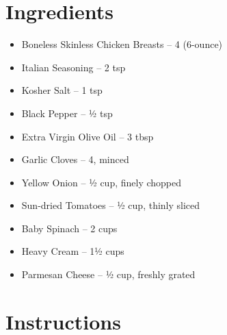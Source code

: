 




\section*{Ingredients}

\begin{itemize}
      \item Boneless Skinless Chicken Breasts – 4 (6-ounce)
      \item[\measure] Italian Seasoning – 2 tsp
      \item[\measure] Kosher Salt – 1 tsp
      \item[\measure] Black Pepper – ½ tsp
      \item[\measure] Extra Virgin Olive Oil – 3 tbsp
      \item[\cut] Garlic Cloves – 4, minced
      \item[\cut] Yellow Onion – ½ cup, finely chopped
      \item[\cut] Sun-dried Tomatoes – ½ cup, thinly sliced
      \item Baby Spinach – 2 cups
      \item[\measure] Heavy Cream – 1½ cups
      \item[\cut] Parmesan Cheese – ½ cup, freshly grated
\end{itemize}

\newpage
{}
\section*{Instructions}

